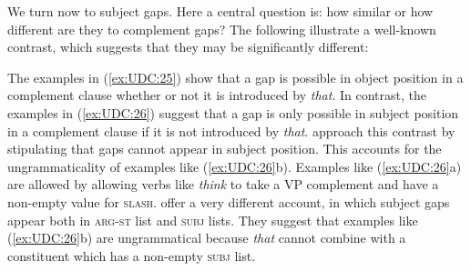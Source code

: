 \documentclass[output=paper
                ,modfonts
                ,nonflat
	        ,collection
	        ,collectionchapter
	        ,collectiontoclongg
 	        ,biblatex
                ,babelshorthands
                ,newtxmath
                ,draftmode
                ,colorlinks, citecolor=brown
]{./langsci/langscibook}
\begin{document}
{%


\bigskip
We turn now to subject gaps. Here a central question is: how similar or
how different are they to complement gaps? The following illustrate a
well-known contrast, which suggests that they may be significantly
different:

\begin{exe} \ex \begin{xlist} \label{ex:UDC:25}

\end{xlist}
\end{exe}

\begin{exe} \ex \begin{xlist} \label{ex:UDC:26}

\end{xlist}
\end{exe}

\noindent
The examples in (\ref{ex:UDC:25}) show that a gap is possible in
object position in a complement clause whether or not it is introduced
by \emph{that}. In contrast, the examples in (\ref{ex:UDC:26}) suggest
that a gap is only possible in subject position in a complement clause
if it is not introduced by \emph{that}. \citet{Pollard:Sag:94}
approach this contrast by stipulating that gaps cannot appear in
subject position. This accounts for the ungrammaticality of examples
like (\ref{ex:UDC:26}b). Examples like (\ref{ex:UDC:26}a) are allowed
by allowing verbs like \textit{think} to take a VP complement and have a
non-empty value for \textsc{slash}. \citet{Ginzburg:Sag:01} offer a very
different account, in which subject gaps appear both in \textsc{arg-st} list
and \textsc{subj} lists. They suggest that examples like (\ref{ex:UDC:26}b) are
ungrammatical because \emph{that} cannot combine with a constituent
which has a non-empty \textsc{subj} list.

}
\end{document}
